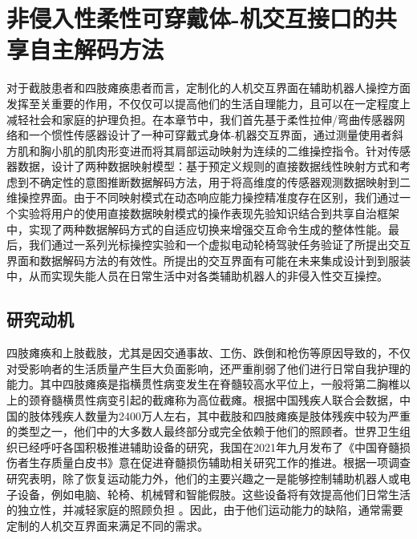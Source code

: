\chapter{非侵入性柔性可穿戴体-机交互接口的共享自主解码方法}

对于截肢患者和四肢瘫痪患者而言，定制化的人机交互界面在辅助机器人操控方面发挥至关重要的作用，不仅仅可以提高他们的生活自理能力，且可以在一定程度上减轻社会和家庭的护理负担。在本章节中，我们首先基于柔性拉伸/弯曲传感器网络和一个惯性传感器设计了一种可穿戴式身体-机器交互界面，通过测量使用者斜方肌和胸小肌的肌肉形变进而将其肩部运动映射为连续的二维操控指令。针对传感器数据，设计了两种数据映射模型：基于预定义规则的直接数据线性映射方式和考虑到不确定性的意图推断数据解码方法，用于将高维度的传感器观测数据映射到二维操控界面。由于不同映射模式在动态响应能力操控精准度存在区别，我们通过一个实验将用户的使用直接数据映射模式的操作表现先验知识结合到共享自治框架中，实现了两种数据解码方式的自适应切换来增强交互命令生成的整体性能。最后，我们通过一系列光标操控实验和一个虚拟电动轮椅驾驶任务验证了所提出交互界面和数据解码方法的有效性。所提出的交互界面有可能在未来集成设计到到服装中，从而实现失能人员在日常生活中对各类辅助机器人的非侵入性交互操控。

\section{研究动机}    
四肢瘫痪和上肢截肢，尤其是因交通事故、工伤、跌倒和枪伤等原因导致的，不仅对受影响者的生活质量产生巨大负面影响，还严重削弱了他们进行日常自我护理的能力。其中四肢瘫痪是指横贯性病变发生在脊髓较高水平位上，一般将第二胸椎以上的颈脊髓横贯性病变引起的截瘫称为高位截瘫。根据中国残疾人联合会数据，中国的肢体残疾人数量为2400万人左右\cite{ZhongGuoCanJiRenFuLiJiJinHuiHuoJuan600WanYuanBangFuPinKunZhiCanRenShi_GunDongXinWen_ZhongGuoZhengFuWang}，其中截肢和四肢瘫痪是肢体残疾中较为严重的类型之一，他们中的大多数人最终部分或完全依赖于他们的照顾者\cite{vitorinodinizRachimeduralTraumaEpidemiology2016}。世界卫生组织已经呼吁各国积极推进辅助设备的研究，我国在2021年九月发布了《中国脊髓损伤者生存质量白皮书》意在促进脊髓损伤辅助相关研究工作的推进。根据一项调查研究表明，除了恢复运动能力外，他们的主要兴趣之一是能够控制辅助机器人或电子设备，例如电脑、轮椅、机械臂和智能假肢。这些设备将有效提高他们日常生活的独立性，并减轻家庭的照顾负担    \cite{orejuela-zapataSelfHelpDevicesQuadriplegic2019}。因此，由于他们运动能力的缺陷，通常需要定制的人机交互界面来满足不同的需求。  

